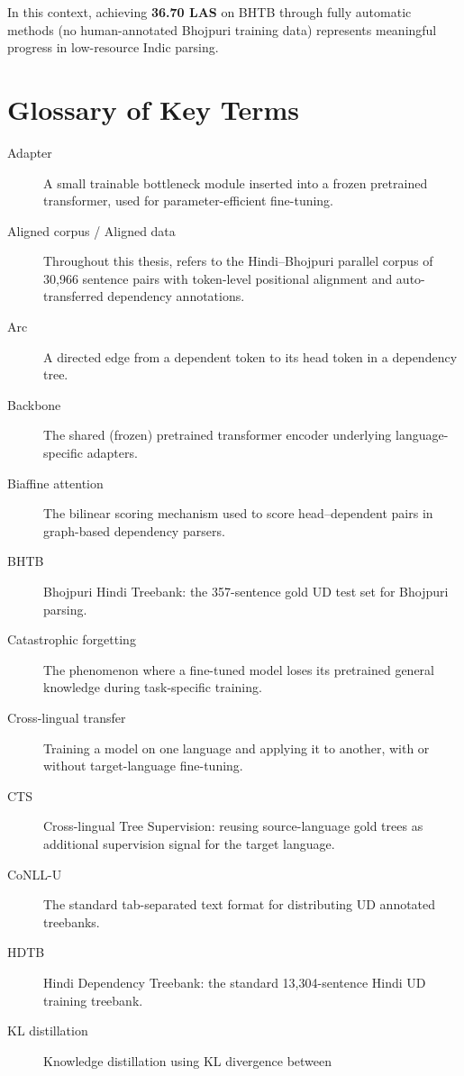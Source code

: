 \documentclass[12pt,a4paper,oneside]{report}
\begin{document}
In this context, achieving \textbf{36.70 LAS} on BHTB through fully automatic
methods (no human-annotated Bhojpuri training data) represents meaningful
progress in low-resource Indic parsing.


\chapter{Glossary of Key Terms}
\label{app:glossary}

\begin{description}
  \item[Adapter] A small trainable bottleneck module inserted into a frozen
        pretrained transformer, used for parameter-efficient fine-tuning.
  \item[Aligned corpus / Aligned data] Throughout this thesis, refers to the
        Hindi--Bhojpuri parallel corpus of 30,966 sentence pairs with
        token-level positional alignment and auto-transferred dependency
        annotations.
  \item[Arc] A directed edge from a dependent token to its head token in a
        dependency tree.
  \item[Backbone] The shared (frozen) pretrained transformer encoder
        underlying language-specific adapters.
  \item[Biaffine attention] The bilinear scoring mechanism used to score
        head--dependent pairs in graph-based dependency parsers.
  \item[BHTB] Bhojpuri Hindi Treebank: the 357-sentence gold UD test set for
        Bhojpuri parsing.
  \item[Catastrophic forgetting] The phenomenon where a fine-tuned model
        loses its pretrained general knowledge during task-specific training.
  \item[Cross-lingual transfer] Training a model on one language and applying
        it to another, with or without target-language fine-tuning.
  \item[CTS] Cross-lingual Tree Supervision: reusing source-language gold
        trees as additional supervision signal for the target language.
  \item[CoNLL-U] The standard tab-separated text format for distributing UD
        annotated treebanks.
  \item[HDTB] Hindi Dependency Treebank: the standard 13,304-sentence Hindi
        UD training treebank.
  \item[KL distillation] Knowledge distillation using KL divergence between

\end{description}
\end{document}
